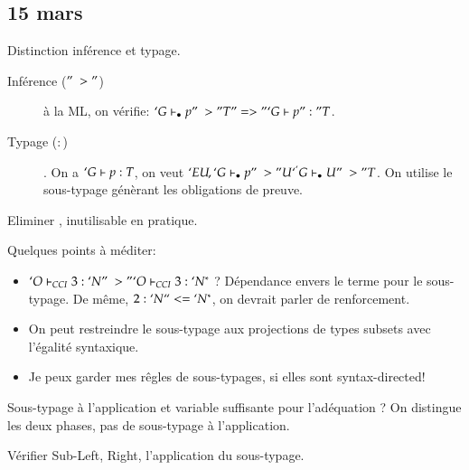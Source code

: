 \subsection*{15 mars}
Distinction inf\'erence et typage. 
\begin{description}
\item[Inf\'erence ($"~>"$)] \`a la ML, on v\'erifie: $`G \vdash_{\bullet} p "~>" T "=>"
  `G \vdash p ":" T$. 
\item[Typage ($:$)]. On a $`G \vdash p : T$, on veut $`E U, `G \vdash_{\bullet} p
  "~>" U `^ `G \vdash_{\bullet} U "~>" T$. On utilise le sous-typage g\'en\`erant les
  obligations de preuve.
\end{description}

Eliminer , inutilisable en pratique.

Quelques points \`a m\'editer:
\begin{itemize}
\item $`O \vdash_{CCI} 3 : `N "~>" `O \vdash_{CCI} 3 : `N^*$ ? D\'ependance envers le
  terme pour le sous-typage. De m\^eme, $2 : `N ``<= `N^*$, on devrait
  parler de renforcement.
\item On peut restreindre le sous-typage aux projections de types
  subsets avec l'\'egalit\'e syntaxique.
\item Je peux garder mes r\^egles de sous-typages, si elles sont syntax-directed!
\end{itemize}

Sous-typage \`a l'application et variable suffisante pour l'ad\'equation ?
On distingue les deux phases, pas de sous-typage \`a l'application.

V\'erifier Sub-{Left, Right}, l'application du sous-typage.

